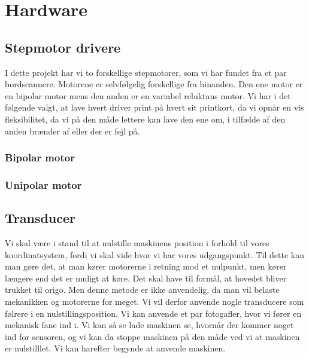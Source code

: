 \chapter[Hardwaredesign]{Hardware}


\section{Stepmotor drivere}
I dette projekt har vi to forskellige stepmotorer, som vi har fundet
fra et par bordscannere. Motorene er selvfølgelig forskellige fra
hinanden. Den ene motor er en bipolar motor mens den anden er en
variabel reluktans motor. Vi har i det følgende valgt, at lave hvert
driver print på hvert sit printkort, da vi opnår en vis fleksibilitet,
da vi på den måde lettere kan lave den ene om, i tilfælde af den anden
brænder af eller der er fejl på. 

\subsection{Bipolar motor}

\subsection{Unipolar motor}

\section{Transducer}
Vi skal være i stand til at nulstille maskinens position i forhold til
vores koordinatsystem, fordi vi skal vide hvor vi har vores
udgangspunkt. Til dette kan man gøre det, at man kører motorerne i
retning mod et nulpunkt, men kører længere end det er muligt at
køre. Det skal have til formål, at hovedet bliver trukket til
origo. Men denne metode er ikke anvendelig, da man vil belaste
mekanikken og motorerne for meget. Vi vil derfor anvende nogle
transducere som følrere i en nulstillingsposition. Vi kan anvende et
par fotogafler, hvor vi fører en mekanisk fane ind i. Vi kan så se
lade maskinen se, hvornår der kommer noget ind for sensoren, og vi kan
da stoppe maskinen på den måde ved vi at maskinen er nulstilllet. Vi
kan harefter begynde at anvende maskinen. 

